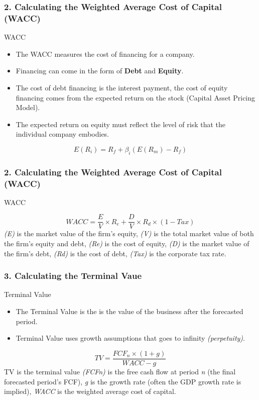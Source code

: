 \documentclass[serif, aspectratio=169]{beamer}
\begin{document}
\begin{frame}
	\frametitle<presentation>{2. Calculating the Weighted Average Cost of Capital (WACC)}
\begin{block}{WACC}
		\begin{itemize}
			\item The WACC measures the cost of financing for a company. 
			\item Financing can come in the form of \textbf{Debt} and \textbf{Equity}. 
			\item The cost of debt financing is the interest payment, the cost of equity financing comes from the expected return on the stock (Capital Asset Pricing Model).
            \item The expected return on equity must reflect the level of risk that the individual company embodies.
    \end{itemize}
    \begin{equation*}
   E(R_i) = R_f + \beta_i (E(R_m) - R_f)     
    \end{equation*}
	\end{block}
\end{frame}

\begin{frame}
	\frametitle<presentation>{2. Calculating the Weighted Average Cost of Capital (WACC)}
\begin{block}{WACC}
		
    \begin{equation*}
WACC = \frac{E}{V} \times R_e + \frac{D}{V} \times R_d \times (1 - Tax)
    \end{equation*}
    \textit{(E)} is the market value of the firm's equity,
\textit{(V)} is the total market value of both the firm's equity and debt,
\textit{(Re)} is the cost of equity,
\textit{(D)} is the market value of the firm's debt,
\textit{(Rd)} is the cost of debt,
\textit{(Tax)} is the corporate tax rate.
	\end{block}
\end{frame}

\begin{frame}
	\frametitle<presentation>{3. Calculating the Terminal Vaue}
\begin{block}{Terminal Value}
		\begin{itemize}
			\item The Terminal Value is the is the value of the business after the forecasted period. 
			\item Terminal Value uses growth assumptions that goes to infinity \textit{(perpetuity)}.
    \end{itemize}
    \begin{equation*}
TV = \frac{{FCF_n \times (1+g)}}{{WACC - g}}    
    \end{equation*}
    TV is the terminal value
\textit{(FCFn)} is the free cash flow at period \textit{n} (the final forecasted period's FCF),
\textit{g} is the growth rate (often the GDP growth rate is implied),
\textit{WACC} is the weighted average cost of capital.
	\end{block}
\end{frame}
\end{document}
